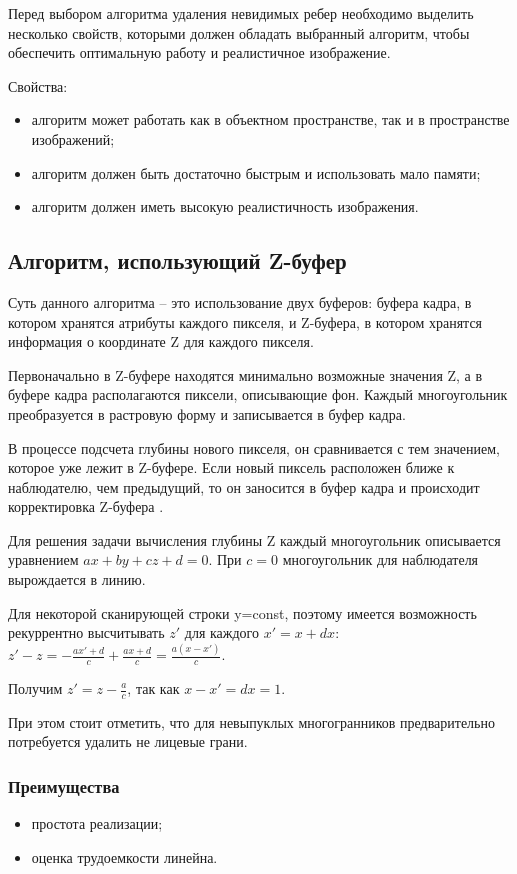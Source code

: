 Перед выбором алгоритма удаления невидимых ребер необходимо выделить несколько свойств, которыми должен обладать выбранный алгоритм, чтобы обеспечить оптимальную работу и реалистичное изображение.

Свойства:	
\begin{itemize}
\item	алгоритм может работать как в объектном пространстве, так и в пространстве изображений;
\item	алгоритм должен быть достаточно быстрым и использовать мало памяти;
\item	алгоритм должен иметь высокую реалистичность изображения.
\end{itemize}

\subsection{Алгоритм, использующий Z-буфер}
Суть данного алгоритма – это использование двух буферов: буфера кадра, в котором хранятся атрибуты каждого пикселя, и Z-буфера, в котором хранятся информация о координате Z для каждого пикселя.

Первоначально в Z-буфере находятся минимально возможные значения Z, а в буфере кадра располагаются пиксели, описывающие фон. Каждый многоугольник преобразуется в растровую форму и записывается в буфер кадра.

В процессе подсчета глубины нового пикселя, он сравнивается с тем значением, которое уже лежит в Z-буфере. Если новый пиксель расположен ближе к наблюдателю, чем предыдущий, то он заносится в буфер кадра и происходит корректировка Z-буфера \cite{zbufer}.

Для решения задачи вычисления глубины Z каждый многоугольник описывается уравнением $ax+by+cz+d=0$. При $c=0$ многоугольник для наблюдателя вырождается в линию. 

Для некоторой сканирующей строки y=const, поэтому имеется возможность рекуррентно высчитывать $z'$ для каждого $x'=x+dx$: $z' - z = - \frac{ax' + d}{c} + \frac{ax + d}{c} = \frac{a(x - x')}{c}$.

Получим $z' = z - \frac{a}{c}$, так как $x - x' = dx = 1$.

При этом стоит отметить, что для невыпуклых многогранников предварительно потребуется удалить не лицевые грани.

\subsubsection*{Преимущества}
\begin{itemize}
	\item простота реализации;
	\item оценка трудоемкости линейна.
\end{itemize}
